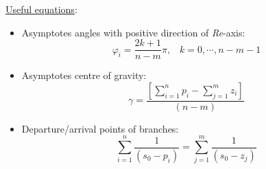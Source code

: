 \documentclass[calculator,datasheet,resit]{exam}
\newcommand{\frc}{\displaystyle\frac}
\begin{document}
\begin{question}
\begin{enumerate}[(a)]
\end{enumerate}




\underline{Useful equations}: 
\begin{itemize}
\item Asymptotes angles with positive direction of {\it Re}-axis: 
\begin{displaymath}
\varphi_{i} = \frc{2k + 1}{n -m}\pi,\;\;\;k=0,\cdots,n-m-1
\end{displaymath}

\item Asymptotes centre of gravity:
\begin{displaymath}
\gamma=\frc{\left[\sum\limits_{i=1}^{n}p_{i}-\sum\limits_{j=1}^{m}z_{i}\right]}{(n-m)}
\end{displaymath}

\item Departure/arrival points of branches: 
\begin{displaymath}
\sum\limits_{i=1}^{n}\frc{1}{\left(s_{0}-p_{i}\right)}=\sum\limits_{j=1}^{m}\frc{1}{\left(s_{0}-z_{j}\right)}
\end{displaymath} 
\end{itemize}


\end{question}


\clearpage
\end{document}
